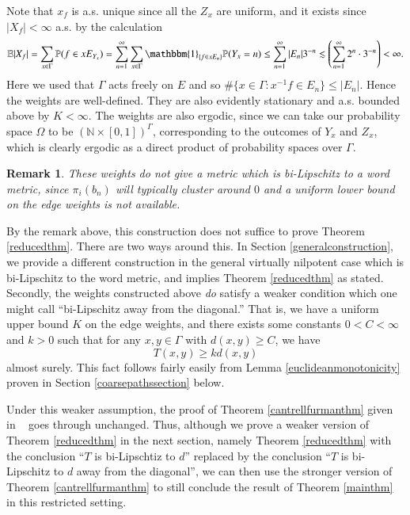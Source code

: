 \documentclass[12pt,reqno]{article}
\numberwithin{equation}{section}
\newcommand{\E}{\mathbb{E}}
\newcommand{\Prob}{\mathbb{P}}
\newcommand{\ind}{\mathbbm{1}}
\newtheorem{rmk}{Remark}
\begin{document}
Note that $x_f$ is a.s. unique since all the $Z_x$ are uniform, and it exists since $|X_f| < \infty$ a.s. by the calculation
\[
\E |X_f| = \sum_{x \in \Gamma} \Prob(f \in xE_{Y_x}) 
= \sum_{n=1}^{\infty} \sum_{x \in \Gamma} \ind_{\{f \in xE_n\}} \Prob(Y_x = n)
\le \sum_{n=1}^{\infty} |E_n| 3^{-n} \lesssim \left( \sum_{n=1}^{\infty} 2^n \cdot 3^{-n} \right) < \infty.
\]
Here we used that $\Gamma$ acts freely on $E$ and so $\#\{x \in \Gamma : x^{-1} f \in E_n\} \le |E_n|$.
Hence the weights are well-defined. They are also evidently stationary and a.s. bounded above by $K < \infty$.
The weights are also ergodic, since we can take our probability space $\Omega$ to be $(\mathbb{N} \times [0,1])^{\Gamma}$,
corresponding to the outcomes of $Y_x$ and $Z_x$, which is clearly ergodic as a direct product of probability spaces over $\Gamma$.
\begin{rmk} \label{bilipschitzcaveat}
These weights do \emph{not} give a metric which is bi-Lipschitz to a word metric, since $\pi_i(b_n)$ will typically cluster around $0$ and a uniform lower bound on the edge weights is not available. 
\end{rmk}

By the remark above, this construction does not suffice to prove Theorem \ref{reducedthm}. There are two ways around this.  
In Section \ref{generalconstruction}, we provide a different construction in the general virtually nilpotent case which is bi-Lipschitz to the word metric, and implies Theorem \ref{reducedthm} as stated.
Secondly, the weights constructed above \emph{do} satisfy a weaker condition which one might call ``bi-Lipschitz away from the diagonal.''
That is, we have a uniform upper bound $K$ on the edge weights, 
and there exists some constants $0<C<\infty$ and $k>0$ such that
for any $x,y \in \Gamma$ with $d(x,y) \ge C$, we have \[T(x,y) \ge k d(x,y)\] almost surely.
This fact follows fairly easily from Lemma \ref{euclideanmonotonicity} proven in Section \ref{coarsepathssection} below.



Under this weaker assumption, the proof of Theorem \ref{cantrellfurmanthm} given in ~\cite{CantrellFurman} goes through unchanged.
Thus, although we prove a weaker version of Theorem \ref{reducedthm}
in the next section, namely Theorem \ref{reducedthm} with the conclusion ``$T$ is bi-Lipschtiz to $d$'' replaced by 
the conclusion ``$T$ is bi-Lipschitz to $d$ away from the diagonal'', we can then use the stronger version of Theorem \ref{cantrellfurmanthm}
to still conclude the result of Theorem \ref{mainthm} in this restricted setting.
\end{document}
